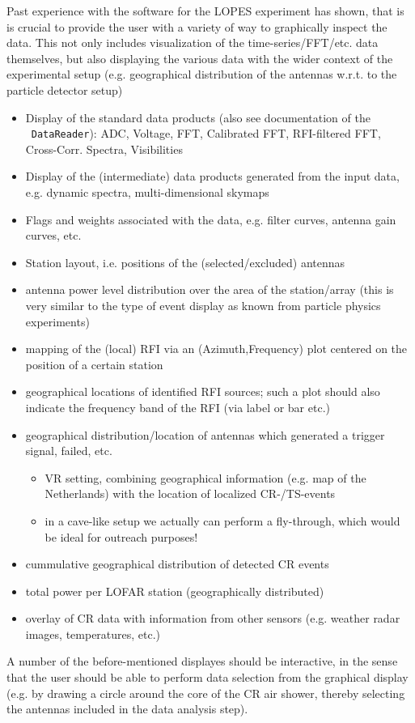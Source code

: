\documentclass[a4paper,10pt,bibtotoc]{scrartcl}
\begin{document}
Past experience with the software for the LOPES experiment has shown, that is
is crucial to provide the user with a variety of way to graphically inspect
the data. This not only includes visualization of the time-series/FFT/etc.
data themselves, but also displaying the various data with the wider context
of the experimental setup (e.g. geographical distribution of the antennas
w.r.t. to the particle detector setup)

\begin{itemize}
\item Display of the standard data products (also see documentation of the
  \lopestools\ \verb|DataReader|): ADC, Voltage, FFT, Calibrated FFT,
  RFI-filtered FFT, Cross-Corr. Spectra, Visibilities
\item Display of the (intermediate) data products generated from the input
  data, e.g. dynamic spectra, multi-dimensional skymaps
\item Flags and weights associated with the data, e.g. filter curves, antenna
  gain curves, etc.
\item Station layout, i.e. positions of the (selected/excluded) antennas
\item antenna power level distribution over the area of the station/array
  (this is very similar to the type of event display as known from particle
  physics experiments)
\item mapping of the (local) RFI via an (Azimuth,Frequency) plot centered on
  the position of a certain station
\item geographical locations of identified RFI sources; such a plot should
  also indicate the  frequency band of the RFI (via label or bar etc.)
\item geographical distribution/location of antennas which generated a trigger
  signal, failed, etc.
  \begin{itemize}
  \item[$\rightarrow$] VR setting, combining geographical information (e.g.
    map of the Netherlands) with the location of localized CR-/TS-events
  \item[$\Rightarrow$] in a cave-like setup we actually can perform a
  fly-through, which would be ideal for outreach purposes!
  \end{itemize}
\item cummulative geographical distribution of detected CR events
\item total power per LOFAR station (geographically distributed)
\item overlay of CR data with information from other sensors (e.g. weather
  radar images, temperatures, etc.)
\end{itemize}
A number of the before-mentioned displayes should be interactive, in the sense
that the user should be able to perform data selection from the graphical
display (e.g. by drawing a circle around the core of the CR air shower,
thereby selecting the antennas included in the data analysis step).
\end{document}
